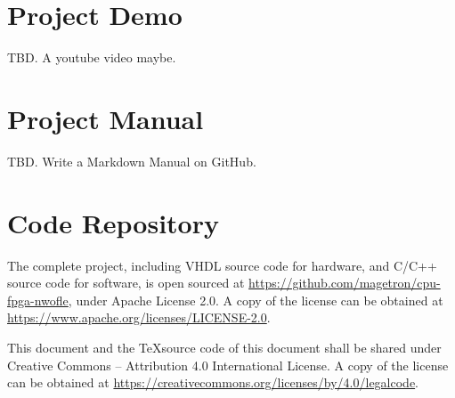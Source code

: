 \documentclass[a4paper]{report}
\newcommand{\proglang}{\textsf}
\begin{document}
\appendix

\chapter{Project Demo}

TBD. A youtube video maybe.

\chapter{Project Manual}

TBD. Write a Markdown Manual on GitHub.

\chapter{Code Repository}

The complete project, including \proglang{VHDL} source code for hardware, and \proglang{C/C++} source code for software, is open sourced at  \url{https://github.com/magetron/cpu-fpga-nwofle}, under Apache License 2.0. A copy of the license can be obtained at \url{https://www.apache.org/licenses/LICENSE-2.0}.

This document and the \TeX  source code of this document shall be shared under Creative Commons – Attribution 4.0 International License. A copy of the license can be obtained at \url{https://creativecommons.org/licenses/by/4.0/legalcode}.


\end{document}
